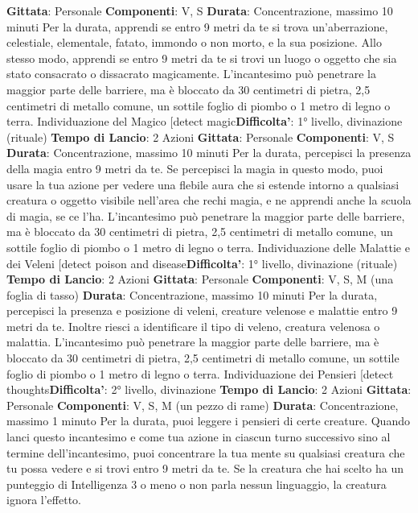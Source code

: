 \begin{multicols}{2}
\textbf{Gittata}: Personale
\textbf{Componenti}: V, S
\textbf{Durata}: Concentrazione, massimo 10 minuti
Per la durata, apprendi se entro 9 metri da te si trova
un’aberrazione, celestiale, elementale, fatato, immondo
o non morto, e la sua posizione. Allo stesso modo,
apprendi se entro 9 metri da te si trovi un luogo o
oggetto che sia stato consacrato o dissacrato
magicamente.
L’incantesimo può penetrare la maggior parte delle
barriere, ma è bloccato da 30 centimetri di pietra, 2,5
centimetri di metallo comune, un sottile foglio di piombo
o 1 metro di legno o terra.
Individuazione del Magico
[detect magic\textbf{Difficolta'}:
1° livello, divinazione (rituale)
\textbf{Tempo di Lancio}: 2 Azioni
\textbf{Gittata}: Personale
\textbf{Componenti}: V, S
\textbf{Durata}: Concentrazione, massimo 10 minuti
Per la durata, percepisci la presenza della magia entro
9 metri da te. Se percepisci la magia in questo modo,
puoi usare la tua azione per vedere una flebile aura che 
si estende intorno a qualsiasi creatura o oggetto visibile
nell’area che rechi magia, e ne apprendi anche la
scuola di magia, se ce l’ha.
L’incantesimo può penetrare la maggior parte delle
barriere, ma è bloccato da 30 centimetri di pietra, 2,5
centimetri di metallo comune, un sottile foglio di piombo
o 1 metro di legno o terra.
Individuazione delle Malattie e dei Veleni
[detect poison and disease\textbf{Difficolta'}:
1° livello, divinazione (rituale)
\textbf{Tempo di Lancio}: 2 Azioni
\textbf{Gittata}: Personale
\textbf{Componenti}: V, S, M (una foglia di tasso)
\textbf{Durata}: Concentrazione, massimo 10 minuti
Per la durata, percepisci la presenza e posizione di
veleni, creature velenose e malattie entro 9 metri da te.
Inoltre riesci a identificare il tipo di veleno, creatura
velenosa o malattia.
L’incantesimo può penetrare la maggior parte delle
barriere, ma è bloccato da 30 centimetri di pietra, 2,5
centimetri di metallo comune, un sottile foglio di piombo
o 1 metro di legno o terra.
Individuazione dei Pensieri
[detect thoughts\textbf{Difficolta'}:
2° livello, divinazione
\textbf{Tempo di Lancio}: 2 Azioni
\textbf{Gittata}: Personale
\textbf{Componenti}: V, S, M (un pezzo di rame)
\textbf{Durata}: Concentrazione, massimo 1 minuto
Per la durata, puoi leggere i pensieri di certe creature.
Quando lanci questo incantesimo e come tua azione in
ciascun turno successivo sino al termine
dell’incantesimo, puoi concentrare la tua mente su
qualsiasi creatura che tu possa vedere e si trovi entro 9
metri da te. Se la creatura che hai scelto ha un
punteggio di Intelligenza 3 o meno o non parla nessun
linguaggio, la creatura ignora l’effetto.

\end{multicols}
